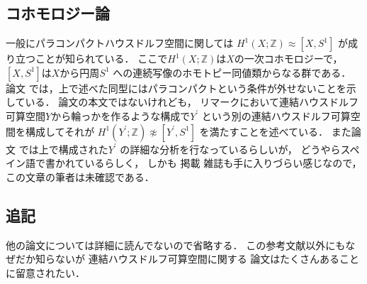\documentclass[leqno, a4paper, 12pt]{jsarticle}
\newcommand{\zz}{\mathbb{Z}}
\begin{document}
\subsection{コホモロジー論}

一般にパラコンパクトハウスドルフ空間に関しては
$H^{1}(X; \zz)\approx [X, S^{1}]$
が成り立つことが知られている．
ここで$H^{1}(X; \zz)$は$X$の一次コホモロジーで，
$[X, S^{1}]$は$X$から円周$S^{1}$
への連続写像のホモトピー同値類からなる群である．
論文
\cite{MR0224086}
では，上で述べた同型にはパラコンパクトという条件が外せないことを示している．
論文\cite{MR0224086}の本文ではないけれども，
リマークにおいて連結ハウスドルフ可算空間$Y$から輪っかを作るような構成で$Y^{\prime}$
という別の連結ハウスドルフ可算空間を構成してそれが
$H^{1}(Y^{\prime}; \zz)\not\approx [Y^{\prime}, S^{1}]$
を満たすことを述べている．
また論文\cite{MR0367974}
では上で構成された$Y^{\prime}$
の詳細な分析を行なっているらしいが，
どうやらスペイン語で書かれているらしく，
しかも
掲載
雑誌も手に入りづらい感じなので，
この文章の筆者は未確認である．

\subsection{追記}
他の論文については詳細に読んでないので省略する．
この参考文献以外にもなぜだか知らないが
連結ハウスドルフ可算空間に関する
論文はたくさんあることに留意されたい．
\nocite{*}


\end{document}

